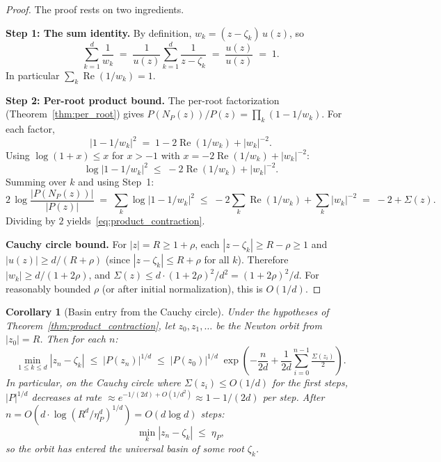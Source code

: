 \documentclass[10pt,a4paper,oneside]{book}
\newtheorem{corollary}[theorem]{Corollary}
\theoremstyle{definition}
\theoremstyle{remark}
\begin{document}
\begin{proof}
The proof rests on two ingredients.

\medskip
\noindent\textbf{Step 1:  The sum identity.}
By definition, $w_k = (z - \zeta_k)\,u(z)$, so
\[
  \sum_{k=1}^d \frac{1}{w_k}
  \;=\; \frac{1}{u(z)}\sum_{k=1}^d \frac{1}{z - \zeta_k}
  \;=\; \frac{u(z)}{u(z)} \;=\; 1.
\]
In particular $\sum_k \operatorname{Re}(1/w_k) = 1$.

\medskip
\noindent\textbf{Step 2:  Per-root product bound.}
The per-root factorization (Theorem~\ref{thm:per_root}) gives $P(N_P(z))/P(z) = \prod_k (1 - 1/w_k)$.  For each factor,
\[
  |1 - 1/w_k|^2 \;=\; 1 - 2\operatorname{Re}(1/w_k) + |w_k|^{-2}.
\]
Using $\log(1 + x) \leq x$ for $x > -1$ with $x = -2\operatorname{Re}(1/w_k) + |w_k|^{-2}$:
\[
  \log|1 - 1/w_k|^2 \;\leq\; -2\operatorname{Re}(1/w_k) + |w_k|^{-2}.
\]
Summing over $k$ and using Step~1:
\[
  2\,\log\frac{|P(N_P(z))|}{|P(z)|}
  \;=\; \sum_k \log|1 - 1/w_k|^2
  \;\leq\; -2\sum_k \operatorname{Re}(1/w_k) + \sum_k |w_k|^{-2}
  \;=\; -2 + \Sigma(z).
\]
Dividing by $2$ yields~\eqref{eq:product_contraction}.

\medskip
\noindent\textbf{Cauchy circle bound.}
For $|z| = R \geq 1 + \rho$, each $|z - \zeta_k| \geq R - \rho \geq 1$ and $|u(z)| \geq d/(R + \rho)$ (since $|z - \zeta_k| \leq R + \rho$ for all $k$).  Therefore $|w_k| \geq d/(1 + 2\rho)$, and $\Sigma(z) \leq d \cdot (1 + 2\rho)^2/d^2 = (1 + 2\rho)^2/d$.  For reasonably bounded $\rho$ (or after initial normalization), this is $O(1/d)$.
\end{proof}

\begin{corollary}[Basin entry from the Cauchy circle]
\label{cor:basin_entry}
Under the hypotheses of Theorem~\ref{thm:product_contraction}, let $z_0, z_1, \ldots$ be the Newton orbit from $|z_0| = R$.  Then for each $n$:
\[
  \min_{1 \leq k \leq d} |z_n - \zeta_k|
  \;\leq\; |P(z_n)|^{1/d}
  \;\leq\; |P(z_0)|^{1/d}\;\exp\!\left(-\frac{n}{2d} + \frac{1}{2d}\sum_{i=0}^{n-1}\tfrac{\Sigma(z_i)}{2}\right).
\]
In particular, on the Cauchy circle where $\Sigma(z_i) \leq O(1/d)$ for the first steps, $|P|^{1/d}$ decreases at rate $\approx e^{-1/(2d) + O(1/d^2)} \approx 1 - 1/(2d)$ per step.  After $n = O(d \cdot \log(R^d/\eta_P^d)^{1/d}) = O(d \log d)$ steps:
\[
  \min_k |z_n - \zeta_k| \;\leq\; \eta_P,
\]
so the orbit has entered the universal basin of some root $\zeta_k$.
\end{corollary}
\end{document}
